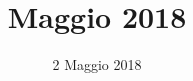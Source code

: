 


\title{ Maggio 2018}
\author{\GroupName}

\date{2 Maggio 2018}



\frenchspacing

\makeFrontPage



